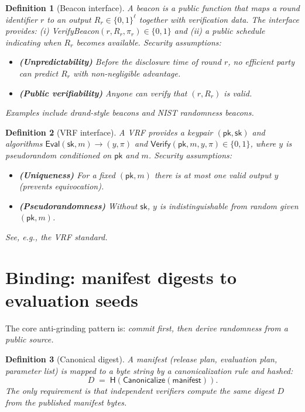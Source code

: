 \documentclass[11pt]{article}
\newtheorem{definition}{Definition}
\newcommand{\Hh}{\mathsf{H}}
\begin{document}
\begin{definition}[Beacon interface]\label{def:beacon}
A beacon is a public function that maps a round identifier $r$ to an output $R_r\in\{0,1\}^\ell$ together with verification data.
The interface provides:
(i) \textsf{VerifyBeacon}$(r,R_r,\pi_r)\in\{0,1\}$ and
(ii) a public schedule indicating when $R_r$ becomes available.
Security assumptions:
\begin{itemize}[leftmargin=1.2em]
\item \textbf{(Unpredictability)} Before the disclosure time of round $r$, no efficient party can predict $R_r$ with non-negligible advantage.
\item \textbf{(Public verifiability)} Anyone can verify that $(r,R_r)$ is valid.
\end{itemize}
Examples include drand-style beacons and NIST randomness beacons.\cite{drand, nist_beacon}
\end{definition}

\begin{definition}[VRF interface]\label{def:vrf}
A VRF provides a keypair $(\mathsf{pk},\mathsf{sk})$ and algorithms
$\mathsf{Eval}(\mathsf{sk},m)\to (y,\pi)$ and $\mathsf{Verify}(\mathsf{pk},m,y,\pi)\in\{0,1\}$,
where $y$ is pseudorandom conditioned on $\mathsf{pk}$ and $m$.
Security assumptions:
\begin{itemize}[leftmargin=1.2em]
\item \textbf{(Uniqueness)} For a fixed $(\mathsf{pk},m)$ there is at most one valid output $y$ (prevents equivocation).
\item \textbf{(Pseudorandomness)} Without $\mathsf{sk}$, $y$ is indistinguishable from random given $(\mathsf{pk},m)$.
\end{itemize}
See, e.g., the VRF standard.\cite{rfc9381_vrf}
\end{definition}

\section{Binding: manifest digests to evaluation seeds}
The core anti-grinding pattern is: \emph{commit first, then derive randomness from a public source.}

\begin{definition}[Canonical digest]\label{def:digest}
A manifest (release plan, evaluation plan, parameter list) is mapped to a byte string by a canonicalization rule and hashed:
\[
D \;=\; \Hh(\textsf{Canonicalize}(\textsf{manifest})).
\]
The only requirement is that independent verifiers compute the same digest $D$ from the published manifest bytes.\cite{rfc8785_jcs}
\end{definition}
\end{document}
